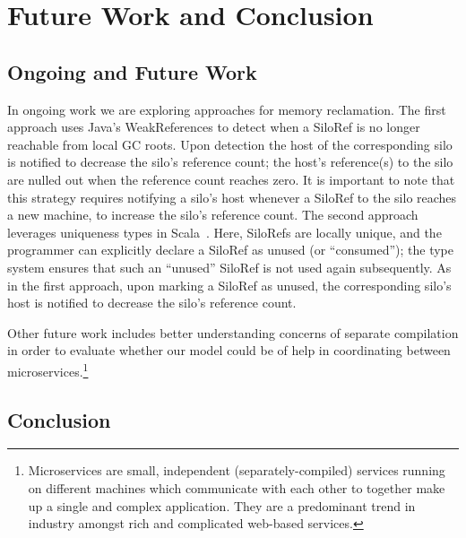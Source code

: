 \documentclass[10pt]{sigplanconf}
\theoremstyle{definition}
\theoremstyle{definition}
\begin{document}


\section{Future Work and Conclusion}
\label{sec:conclusion-future-work}

\subsection{Ongoing and Future Work}

In ongoing work we are exploring approaches for memory reclamation. The first
approach uses Java's WeakReferences to detect when a SiloRef is no longer
reachable from local GC roots. Upon detection the host of the corresponding silo
is notified to decrease the silo's reference count; the host's reference(s) to
the silo are nulled out when the reference count reaches zero. It is important
to note that this strategy requires notifying a silo's host whenever a SiloRef
to the silo reaches a new machine, to increase the silo's reference count. The
second approach leverages uniqueness types in Scala~\cite{Haller10,Haller16}.
Here, SiloRefs are locally unique, and the programmer can explicitly declare a
SiloRef as unused (or ``consumed''); the type system ensures that such an
``unused'' SiloRef is not used
again subsequently. As in the first approach, upon marking a SiloRef as unused,
the corresponding silo's host is notified to decrease the silo's reference
count.

Other future work includes better understanding concerns of separate compilation
in order to evaluate whether our model could be of help in coordinating between
microservices.\footnote{Microservices are small, independent
(separately-compiled) services running on different machines which communicate
with each other to together make up a single and complex application. They are a
predominant trend in industry amongst rich and complicated web-based services.}

\subsection{Conclusion}
\end{document}
